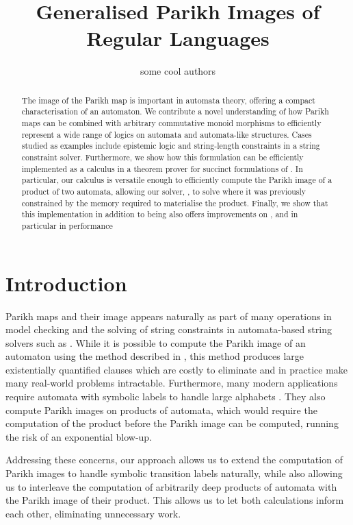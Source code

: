 \documentclass[runningheads]{llncs}
\title{Generalised Parikh Images of Regular Languages}
\author{some cool authors}
\institute{Uppsala University, Sweden}
\begin{document}
\maketitle

\begin{abstract}
  The image of the Parikh map is important in automata theory, offering a compact characterisation of an automaton. We contribute a novel understanding of how Parikh maps can be combined with arbitrary commutative monoid morphisms to efficiently represent a wide range of logics on automata and automata-like structures. Cases studied as examples include epistemic logic and string-length constraints in a string constraint solver. Furthermore, we show how this formulation can be efficiently implemented as a calculus in a theorem prover for succinct formulations of . In particular, our calculus is versatile enough to efficiently compute the Parikh image of a product of two automata, allowing our solver, \Ostrich{}, to solve  where it was previously constrained by the memory required to materialise the product. Finally, we show that this implementation in addition to being  also offers  improvements on , and in particular  in performance 
\end{abstract}

\section{Introduction}

Parikh maps and their image appears naturally as part of many operations in model checking and the solving of string constraints in automata-based string solvers such as \Ostrich{}. While it is possible to compute the Parikh image of an automaton using the method described in \cite{generate-parikh-image}, this method produces large existentially quantified clauses which are costly to eliminate and in practice make many real-world problems intractable. Furthermore, many modern applications require automata with symbolic labels to handle large alphabets . They also compute Parikh images on products of automata, which would require the computation of the product before the Parikh image can be computed, running the risk of an exponential blow-up.

Addressing these concerns, our approach allows us to extend the computation of Parikh images to handle symbolic transition labels naturally, while also allowing us to interleave the computation of arbitrarily deep products of automata with the Parikh image of their product. This allows us to let both calculations inform each other, eliminating unnecessary work.
\end{document}

